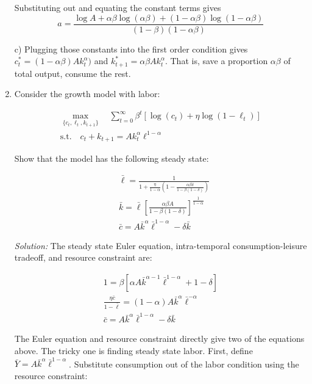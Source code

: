 \documentclass[12pt]{article}
\newif\ifsln
\begin{document}
\begin{enumerate}[1.]
Substituting out and equating the constant terms gives
\[a = \frac{\log A + \alpha \beta \log (\alpha \beta) + (1-\alpha \beta) \log(1-\alpha\beta)}{(1-\beta)(1-\alpha \beta)} \]
\medskip

c) Plugging those constants into the first order condition gives $c_{t}^{*} = (1 - \alpha\beta)Ak_{t}^{\alpha})$ and $k_{t+1}^{*} = \alpha\beta Ak_{t}^{\alpha}$. That is, save a proportion $\alpha \beta$ of total output, consume the rest.
\fi

\item Consider the growth model with labor:

\begin{gather*}
\underset{\{c_{t},\ell_{t},  k_{t+1}\}}{\max} \quad \sum_{t=0}^{\infty} \beta^{t}[ \log(c_{t}) + \eta \log(1-\ell_{t})]\\
\text{s.t.} \quad c_{t} + k_{t+1} = Ak_{t}^{\alpha}\ell^{1-\alpha}
\end{gather*}

Show that the model has the following steady state:

\begin{align*}
&\bar{\ell} = \frac{1}{1 + \frac{\eta}{1-\alpha} ( 1 - \frac{\alpha \beta \delta}{1 - \beta(1 - \delta)})}\\
&\bar{k} = \bar{\ell}\left[ \frac{\alpha\beta A}{1 - \beta(1-\delta)}\right]^{\frac{1}{1-\alpha}}\\
&\bar{c} = A\bar{k}^{\alpha}\bar{\ell}^{1-\alpha} - \delta \bar{k}
\end{align*}

\ifsln
\textit{Solution:}
The steady state Euler equation, intra-temporal consumption-leisure tradeoff, and resource constraint are:

\begin{gather}
1 = \beta\left[\alpha A \bar{k}^{\alpha - 1}\bar{\ell}^{1-\alpha} + 1 - \delta  \right]\\
\frac{\eta \bar{c}}{1 - \bar{\ell}} = (1-\alpha)A\bar{k}^{\alpha}\bar{\ell}^{-\alpha}\\
\bar{c} = A\bar{k}^{\alpha}\bar{\ell}^{1-\alpha} - \delta \bar{k}
\end{gather}


The Euler equation and resource constraint directly give two of the equations above. The tricky one is finding steady state labor. First, define $\bar{Y} = A\bar{k}^{\alpha}\bar{\ell}^{1-\alpha}$. Substitute consumption out of the labor condition using the resource constraint:


\end{enumerate}
\end{document}
